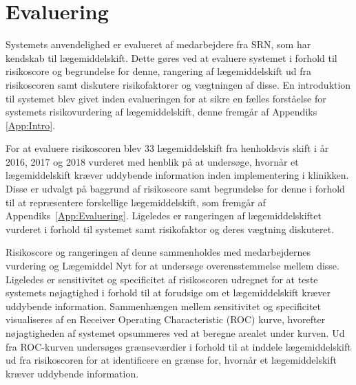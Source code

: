 \section{Evaluering}
Systemets anvendelighed er evalueret af medarbejdere fra SRN, som har kendskab til lægemiddelskift. Dette gøres ved at evaluere systemet i forhold til risikoscore og begrundelse for denne, rangering af lægemiddelskift ud fra risikoscoren samt diskutere risikofaktorer og vægtningen af disse. En introduktion til systemet blev givet inden evalueringen for at sikre en fælles forståelse for systemets risikovurdering af lægemiddelskift, denne fremgår af Appendiks \ref{App:Intro}. 

For at evaluere risikoscoren blev 33 lægemiddelskift fra henholdsvis skift i år 2016, 2017 og 2018 vurderet med henblik på at undersøge, hvornår et lægemiddelskift kræver uddybende information inden implementering i klinikken. Disse er udvalgt på baggrund af risikoscore samt begrundelse for denne i forhold til at repræsentere forskellige lægemiddelskift, som fremgår af Appendiks~\ref{App:Evaluering}. Ligeledes er rangeringen af lægemiddelskiftet vurderet i forhold til systemet samt risikofaktor og deres vægtning diskuteret. 

Risikoscore og rangeringen af denne sammenholdes med medarbejdernes vurdering og Lægemiddel Nyt for at undersøge overensstemmelse mellem disse. Ligeledes er sensitivitet og specificitet af risikoscoren udregnet for at teste systemets nøjagtighed i forhold til at forudsige om et lægemiddelskift kræver uddybende information. Sammenhængen mellem sensitivitet og specificitet visualiseres af en Receiver Operating Characteristic (ROC) kurve, hvorefter nøjagtigheden af systemet opsummeres ved at beregne arealet under kurven. Ud fra ROC-kurven undersøges grænseværdier i forhold til at inddele lægemiddelskift ud fra risikoscoren for at identificere en grænse for, hvornår et lægemiddelskift kræver uddybende information.



